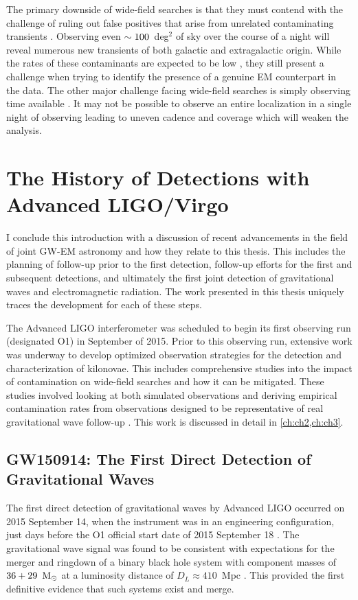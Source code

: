 The primary downside of wide-field searches is that they must contend with the challenge of ruling out false positives that arise from unrelated contaminating transients \citep{CowpBerger15}. Observing even $\sim100$~deg$^2$ of sky over the course of a night will reveal numerous new transients of both galactic and extragalactic origin. While the rates of these contaminants are expected to be low \citep[$\mathcal{R} \apx 2$ events per deg$^2$][]{Cowp+17}, they still present a challenge when trying to identify the presence of a genuine EM counterpart in the data. The other major challenge facing wide-field searches is simply observing time available \citep{CowpBerger15}. It may not be possible to observe an entire localization in a single night of observing leading to uneven cadence and coverage which will weaken the analysis.

\section{The History of Detections with Advanced LIGO/Virgo}
\label{sec:intro_history}
I conclude this introduction with a discussion of recent advancements in the field of joint GW-EM astronomy and how they relate to this thesis. This includes the planning of follow-up prior to the first detection, follow-up efforts for the first and subsequent detections, and ultimately the first joint detection of gravitational waves and electromagnetic radiation. The work presented in this thesis uniquely traces the development for each of these steps.

The Advanced LIGO interferometer was scheduled to begin its first observing run (designated O1) in September of 2015. Prior to this observing run, extensive work was underway to develop optimized observation strategies for the detection and characterization of kilonovae. This includes comprehensive studies into the impact of contamination on wide-field searches and how it can be mitigated. These studies involved looking at both simulated observations and deriving empirical contamination rates from observations designed to be representative of real gravitational wave follow-up \citep{CowpBerger15,Cowp+17b}. This work is discussed in detail in \cref{ch:ch2,ch:ch3}.

\subsection{GW150914: The First Direct Detection of Gravitational Waves}
\label{sec:intro_gw150914}
The first direct detection of gravitational waves by Advanced LIGO occurred on 2015 September 14, when the instrument was in an engineering configuration, just days before the O1 official start date of 2015 September 18 \citep{LIGOGW150914}. The gravitational  wave signal was found to be consistent with expectations for the merger and ringdown of a binary black hole system with component masses of $36+29~{\rm\,M_\odot}$ at a luminosity distance of $D_L \approx 410$~Mpc \citep{LIGOGW150914}. This provided the first definitive evidence that such systems exist and merge.


